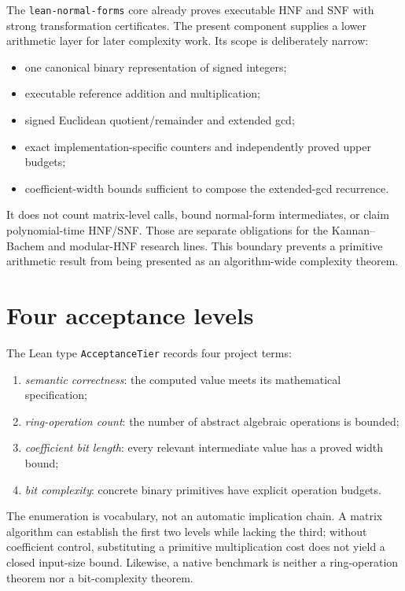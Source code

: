 \documentclass[11pt]{article}
\newcommand{\code}[1]{\texttt{#1}}
\begin{document}
The \code{lean-normal-forms} core already proves executable HNF and SNF with
strong transformation certificates.  The present component supplies a lower
arithmetic layer for later complexity work.  Its scope is deliberately
narrow:
\begin{itemize}
  \item one canonical binary representation of signed integers;
  \item executable reference addition and multiplication;
  \item signed Euclidean quotient/remainder and extended gcd;
  \item exact implementation-specific counters and independently proved
        upper budgets;
  \item coefficient-width bounds sufficient to compose the extended-gcd
        recurrence.
\end{itemize}
It does not count matrix-level calls, bound normal-form intermediates, or
claim polynomial-time HNF/SNF.  Those are separate obligations for the
Kannan--Bachem and modular-HNF research lines.  This boundary prevents a
primitive arithmetic result from being presented as an algorithm-wide
complexity theorem.

\section{Four acceptance levels}

The Lean type \code{AcceptanceTier} records four project terms:
\begin{enumerate}
  \item \emph{semantic correctness}: the computed value meets its
        mathematical specification;
  \item \emph{ring-operation count}: the number of abstract algebraic
        operations is bounded;
  \item \emph{coefficient bit length}: every relevant intermediate value has
        a proved width bound;
  \item \emph{bit complexity}: concrete binary primitives have explicit
        operation budgets.
\end{enumerate}
The enumeration is vocabulary, not an automatic implication chain.  A
matrix algorithm can establish the first two levels while lacking the third;
without coefficient control, substituting a primitive multiplication cost
does not yield a closed input-size bound.  Likewise, a native benchmark is
neither a ring-operation theorem nor a bit-complexity theorem.
\end{document}
